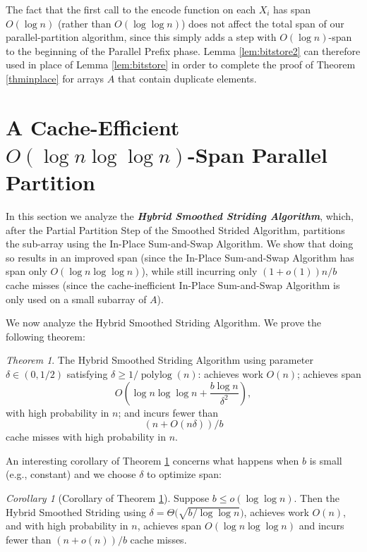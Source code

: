 \documentclass[11pt]{article}
\newcommand{\polylog}{\operatorname{polylog}}
\newcommand{\defn}[1]{{\textit{\textbf{\boldmath #1}}}}
\theoremstyle{remark}
\newtheorem{theorem}{Theorem}[section]
\newtheorem{corollary}[thm]{Corollary}
\theoremstyle{remark}
\begin{document}
The fact that the first call to the encode function on each $X_i$ has
span $O(\log n)$ (rather than $O(\log \log n)$) does not affect the
total span of our parallel-partition algorithm, since this simply adds
a step with $O(\log n)$-span to the beginning of the Parallel Prefix
phase. Lemma \ref{lem:bitstore2} can therefore used in place of Lemma
\ref{lem:bitstore} in order to complete the proof of Theorem
\ref{thminplace} for arrays $A$ that contain duplicate elements.


\section{A Cache-Efficient $O(\log n \log \log n)$-Span Parallel Partition}
\label{sec:hybridSmoothedStriding}

In this section we analyze the \defn{Hybrid Smoothed Striding
Algorithm}, which, after the Partial Partition Step of the
Smoothed Strided Algorithm, partitions the sub-array using the
In-Place Sum-and-Swap Algorithm. We show that doing so results in
an improved span (since the In-Place Sum-and-Swap Algorithm has
span only $O(\log n \log \log n)$), while still incurring only
$(1 + o(1))n/b$ cache misses (since the cache-inefficient
In-Place Sum-and-Swap Algorithm is only used on a small subarray
of $A$). 

We now analyze the Hybrid Smoothed Striding Algorithm. We prove
the following theorem:
\begin{theorem}
  \label{thm:fullPartition} The Hybrid Smoothed Striding
  Algorithm using parameter $\delta\in(0,1/2)$ satisfying $\delta
  \ge 1/\polylog(n)$: achieves work $O(n)$; achieves span
  $$O\left(\log n \log\log n +\frac{b\log n}{\delta^2}\right),$$ with
  high probability in $n$; and incurs fewer than
  $$(n+O(n\delta))/b$$ cache misses with high probability in $n$.
\end{theorem}


An interesting corollary of Theorem \ref{thm:fullPartition}
concerns what happens when $b$ is small (e.g., constant) and we
choose $\delta$ to optimize span:

\begin{corollary}[Corollary of Theorem \ref{thm:fullPartition}]
  \label{cor:fullPartition}
Suppose $b \le o(\log \log n)$. Then the Hybrid Smoothed Striding
using $\delta = \Theta\big(\sqrt{b/\log\log n}\big)$, achieves
work $O(n)$, and with high probability in $n$, achieves span
$O(\log n \log\log n)$ and incurs fewer than $(n+o(n))/b$ cache misses.
\end{corollary}
\end{document}
